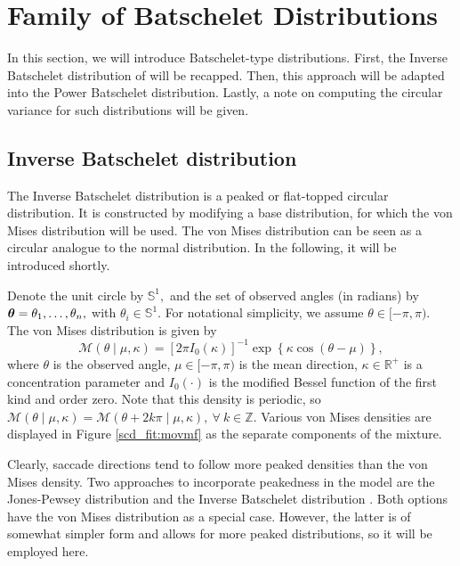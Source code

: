 \section{Family of Batschelet Distributions}
\label{sec:model}

In this section, we will introduce Batschelet-type distributions. First, the Inverse Batschelet distribution of \citet{jones2012inverse} will be recapped. Then, this approach will be adapted into the Power Batschelet distribution. Lastly, a note on computing the circular variance for such distributions will be given.

\subsection{Inverse Batschelet distribution}

The Inverse Batschelet distribution is a peaked or flat-topped circular distribution. It is constructed by modifying a base distribution, for which the von Mises distribution will be used. The von Mises distribution can be seen as a circular analogue to the normal distribution. In the following, it will be introduced shortly.

Denote the unit circle by \(\mathbb{S}^1,\) and the set of observed angles (in radians) by \(\boldsymbol{\theta} = \theta_1, \dots, \theta_n,\) with \(\theta_i \in \mathbb{S}^1.\) For notational simplicity, we assume \(\theta \in [-\pi, \pi).\) The von Mises distribution is given by
\begin{equation}
\mathcal{M} (\theta \mid \mu, \kappa) = \left[ 2 \pi I_0 (\kappa) \right]^{-1} \exp \left\{ \kappa \cos (\theta - \mu) \right\},
\end{equation}
where \( \theta \) is the observed angle, \( \mu \in [-\pi, \pi)\) is the mean direction, \( \kappa \in \mathbb{R}^+ \) is a concentration parameter and \( I_0(\cdot) \) is the modified Bessel function of the first kind and order zero. Note that this density is periodic, so \( \mathcal{M} (\theta \mid \mu, \kappa) = \mathcal{M} (\theta + 2 k \pi \mid \mu, \kappa), ~ \forall ~ k \in \mathbb{Z}.\) Various von Mises densities are displayed in Figure \ref{scd_fit:movmf} as the separate components of the mixture.

Clearly, saccade directions tend to follow more peaked densities than the von Mises density. Two approaches to incorporate peakedness in the model are the Jones-Pewsey distribution \citep{jones2005family} and the Inverse Batschelet distribution \citep{jones2012inverse}. Both options have the von Mises distribution as a special case. However, the latter is of somewhat simpler form and allows for more peaked distributions, so it will be employed here.

